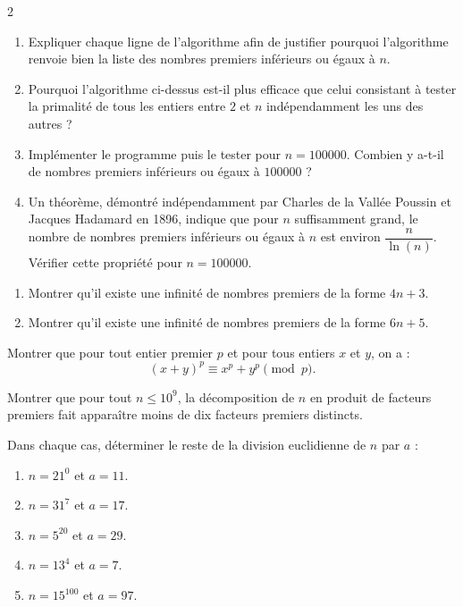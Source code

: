 \documentclass[a4paper,12pt]{article}
\begin{document}
\begin{multicols}{2}
\begin{exercice}[title=Exercice 14 $\star\star\star$ { [Modéliser, Représenter] }]{}{}
  \begin{enumerate}
    \item Expliquer chaque ligne de l'algorithme afin de justifier pourquoi l'algorithme renvoie bien la liste des nombres premiers inférieurs ou égaux à $n$.
    \item Pourquoi l'algorithme ci-dessus est-il plus efficace que celui consistant à tester la primalité de tous les entiers entre $2$ et $n$ indépendamment les uns des autres ?
    \item Implémenter le programme puis le tester pour $n = 100000$.
      Combien y a-t-il de nombres premiers inférieurs ou égaux à $100000$ ?
    \item Un théorème, démontré indépendamment par Charles de la Vallée Poussin et Jacques Hadamard en 1896, indique que pour $n$ suffisamment grand, le nombre de nombres premiers inférieurs ou égaux à $n$ est environ $\dfrac{n}{\ln(n)}$.
      Vérifier cette propriété pour $n = 100000$.
  \end{enumerate}
\end{exercice}

\begin{exercice}[title=Exercice 15 $\star\star\star$ { [Raisonner, Communiquer] }]{}{}
  \begin{enumerate}
    \item Montrer qu'il existe une infinité de nombres premiers de la forme $4n + 3$.
    \item Montrer qu'il existe une infinité de nombres premiers de la forme $6n + 5$.
  \end{enumerate}
\end{exercice}

\begin{exercice}[title=Exercice 16 $\star\star$ { [Calculer, Raisonner] }]{}{}
  Montrer que pour tout entier premier $p$ et pour tous entiers $x$ et $y$, on a :
  \[
    (x + y)^p \equiv x^p + y^p \pmod{p}.
  \]
\end{exercice}

\begin{exercice}[title=Exercice 17 $\star\star$ { [Chercher] }]{}{}
  Montrer que pour tout $n \le 10^9$, la décomposition de $n$ en produit de facteurs premiers fait apparaître moins de dix facteurs premiers distincts.
\end{exercice}

\begin{exercice}[title=Exercice 18 $\star$ { [Calculer] }]{}{}
  Dans chaque cas, déterminer le reste de la division euclidienne de $n$ par $a$ :
  \begin{enumerate}
    \item $n = 21^0$ et $a = 11$.
    \item $n = 31^7$ et $a = 17$.
    \item $n = 5^{20}$ et $a = 29$.
    \item $n = 13^4$ et $a = 7$.
    \item $n = 15^{100}$ et $a = 97$.
  \end{enumerate}
\end{exercice}


\end{multicols}
\end{document}
